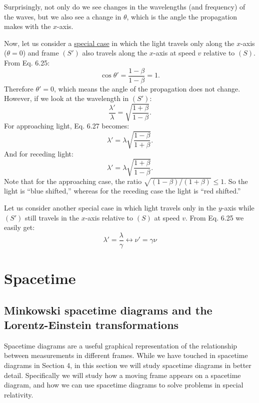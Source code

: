 \documentclass[a4paper,11pt]{article}
\numberwithin{equation}{section}
\begin{document}
 \noindent Surprisingly, not only do we see changes in the wavelengths (and frequency) of the waves, but we also see a change in $\theta$, which is the angle the propagation makes with the $x$-axis. 
 
 \noindent Now, let us consider a \underline{special case} in which the light travels only along the $x$-axis ($\theta = 0$) and frame $(S')$ also travels along the $x$-axis at speed $v$ relative to $(S)$. From Eq. 6.25:
 \begin{equation}
 \cos\theta'=\frac{1-\beta}{1-\beta}=1.
 \end{equation} 
 Therefore $\theta'=0$, which means the angle of the propagation does not change. However, if we look at the wavelength in $(S')$:
 \begin{equation}
 \frac{\lambda'}{\lambda} = \sqrt{\frac{1+\beta}{1-\beta}}.
 \end{equation} 
 For approaching light, Eq. 6.27 becomes:
 \begin{equation}
 \lambda'=\lambda\sqrt{\frac{1-\beta}{1+\beta}}.
 \end{equation}
 And for receding light:
 \begin{equation}
 \lambda'=\lambda\sqrt{\frac{1+\beta}{1-\beta}}.
 \end{equation}
 Note that for the approaching case, the ratio $\sqrt{(1-\beta)/(1+\beta)} \leq 1$. So the light is ``blue shifted,'' whereas for the receding case the light is ``red shifted.''
 
 \noindent Let us consider another special case in which light travels only in the $y$-axis while $(S')$ still travels in the $x$-axis relative to $(S)$ at speed $v$. From Eq. 6.25 we easily get:
 \begin{equation}
 \lambda'=\frac{\lambda}{\gamma} \leftrightarrow \nu'=\gamma\nu
 \end{equation}
 
 \newpage
 
 \section{Spacetime}
 \subsection{Minkowski spacetime diagrams and the Lorentz-Einstein transformations}
 Spacetime diagrams are a useful graphical representation of the relationship between measurements in different frames. While we have touched in spacetime diagrams in Section 4, in this section we will study spacetime diagrams in better detail. Specifically we will study how a moving frame appears on a spacetime diagram, and how we can use spacetime diagrams to solve problems in special relativity. 
 
\end{document}
